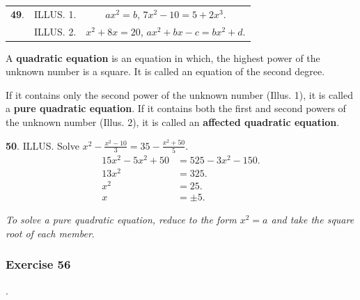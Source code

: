 \documentclass{book}
\begin{document}
\begin{tabular}{llc} \textbf{ 49}. &ILLUS. 1.& $ax^2 = b$, $7x^2-10 =
5+2x^3$.\\
& ILLUS. 2. &$x^2+8x = 20$, $ax^2+bx-c = bx^2+d$.
\end{tabular}

A \textbf{ quadratic equation} is an equation in which, the
highest power of the unknown number is a square. It is called an
equation of the second degree.

If it contains only the second power of the unknown number (Illus.
1), it is called a \textbf{ pure quadratic equation}. If it
contains both the first and second powers of the unknown number
(Illus. 2), it is called an \textbf{ affected quadratic equation}.

\textbf{ 50}. ILLUS. Solve $x^2-\frac{x^2-10}{3} =
35-\frac{x^2+50}{5}$.
\begin{align}
15x^2-5x^2+50 &= 525-3x^2-150.\\
        13x^2 &= 325.\\
          x^2 &= 25.\\
            x &= {\pm}5.
\end{align}

\textit{ To solve a pure quadratic equation, reduce to the form
$x^2 = a$ and take the square root of each member}.

\subsubsection*{Exercise 56}.
\end{document}
